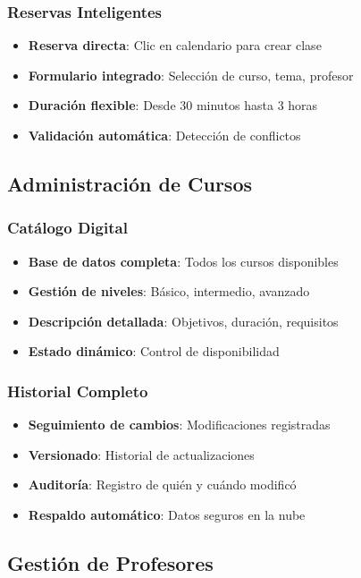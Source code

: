 \documentclass[12pt,a4paper]{article}
\begin{document}
\subsubsection{Reservas Inteligentes}
\begin{itemize}
    \item \textbf{Reserva directa}: Clic en calendario para crear clase
    \item \textbf{Formulario integrado}: Selección de curso, tema, profesor
    \item \textbf{Duración flexible}: Desde 30 minutos hasta 3 horas
    \item \textbf{Validación automática}: Detección de conflictos
\end{itemize}

\subsection{Administración de Cursos}

\subsubsection{Catálogo Digital}
\begin{itemize}
    \item \textbf{Base de datos completa}: Todos los cursos disponibles
    \item \textbf{Gestión de niveles}: Básico, intermedio, avanzado
    \item \textbf{Descripción detallada}: Objetivos, duración, requisitos
    \item \textbf{Estado dinámico}: Control de disponibilidad
\end{itemize}

\subsubsection{Historial Completo}
\begin{itemize}
    \item \textbf{Seguimiento de cambios}: Modificaciones registradas
    \item \textbf{Versionado}: Historial de actualizaciones
    \item \textbf{Auditoría}: Registro de quién y cuándo modificó
    \item \textbf{Respaldo automático}: Datos seguros en la nube
\end{itemize}

\subsection{Gestión de Profesores}
\end{document}
